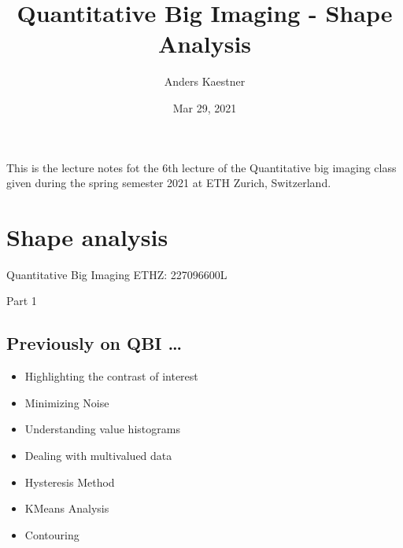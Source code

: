 \documentclass[letterpaper,10pt,english]{sphinxmanual}
\title{Quantitative Big Imaging - Shape Analysis}
\date{Mar 29, 2021}
\author{Anders Kaestner}
\begin{document}
\pagestyle{empty}
\sphinxmaketitle
\pagestyle{plain}
\sphinxtableofcontents
\pagestyle{normal}
\label{\detokenize{preface::doc}}


\sphinxAtStartPar
This is the lecture notes fot the 6th lecture of the Quantitative big imaging class given during the spring semester 2021 at ETH Zurich, Switzerland.


\chapter{Shape analysis}
\label{\detokenize{06-ShapeAnalysis:shape-analysis}}\label{\detokenize{06-ShapeAnalysis::doc}}




\sphinxAtStartPar
Quantitative Big Imaging ETHZ: 227\sphinxhyphen{}0966\sphinxhyphen{}00L


\sphinxAtStartPar
Part 1






\section{Previously on QBI …}
\label{\detokenize{06-ShapeAnalysis:previously-on-qbi}}

\begin{itemize}
\item {} 
\sphinxAtStartPar
Highlighting the contrast of interest

\item {} 
\sphinxAtStartPar
Minimizing Noise



\item {} 
\sphinxAtStartPar
Understanding value histograms

\item {} 
\sphinxAtStartPar
Dealing with multi\sphinxhyphen{}valued data



\item {} 
\sphinxAtStartPar
Hysteresis Method

\item {} 
\sphinxAtStartPar
K\sphinxhyphen{}Means Analysis



\item {} 
\sphinxAtStartPar
Contouring



\end{itemize}
\end{document}

